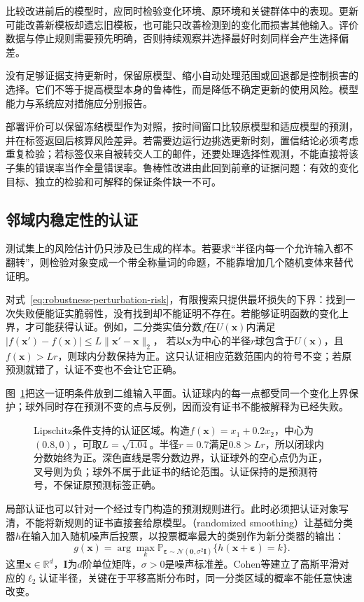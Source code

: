 比较改进前后的模型时，应同时检验变化环境、原环境和关键群体中的表现。更新可能改善新模板却遗忘旧模板，也可能只改善检测到的变化而损害其他输入。评价数据与停止规则需要预先明确，否则持续观察并选择最好时刻同样会产生选择偏差。

没有足够证据支持更新时，保留原模型、缩小自动处理范围或回退都是控制损害的选择。它们不等于提高模型本身的鲁棒性，而是降低不确定更新的使用风险。模型能力与系统应对措施应分别报告。

部署评价可以保留冻结模型作为对照，按时间窗口比较原模型和适应模型的预测，并在标签返回后核算风险差异。若需要边运行边挑选更新时刻，置信结论必须考虑重复检验；若标签仅来自被转交人工的邮件，还要处理选择性观测，不能直接将该子集的错误率当作全量错误率。鲁棒性改进由此回到前章的证据问题：有效的变化目标、独立的检验和可解释的保证条件缺一不可。

\subsection{邻域内稳定性的认证}
\label{sec:robustness-certification}

测试集上的风险估计仍只涉及已生成的样本。若要求“半径内每一个允许输入都不翻转”，则检验对象变成一个带全称量词的命题，不能靠增加几个随机变体来替代证明。

对式~\eqref{eq:robustness-perturbation-risk}，有限搜索只提供最坏损失的下界：找到一次失败便能证实脆弱性，没有找到却不能证明不存在。若能够证明函数的变化上界，才可能获得认证。例如，二分类实值分数$f$在$U(\bm{x})$内满足
$|f(\bm{x}')-f(\bm{x})|\leq L\lVert\bm{x}'-\bm{x}\rVert_2$，
若以$\bm{x}$为中心的半径$r$球包含于$U(\bm{x})$，且$f(\bm{x})>Lr$，则球内分数保持为正。这只认证相应范数范围内的符号不变；若原预测就错了，认证不变也不会让它正确。

图~\ref{fig:trust-certified-region}把这一证明条件放到二维输入平面。认证球内的每一点都受同一个变化上界保护；球外同时存在预测不变的点与反例，因而没有证书不能被解释为已经失败。

\begin{figure}[!htb]
  \centering
  
  \caption{Lipschitz条件支持的认证区域。构造$f(\bm x)=x_1+0.2x_2$，中心为$(0.8,0)$，可取$L=\sqrt{1.04}$。半径$r=0.7$满足$0.8>Lr$，所以闭球内分数始终为正。深色直线是零分数边界，认证球外的空心点仍为正，叉号则为负；球外不属于此证书的结论范围。认证保持的是预测符号，不保证原预测标签正确。}
  \label{fig:trust-certified-region}
\end{figure}

局部认证也可以针对一个经过专门构造的预测规则进行。此时必须把认证对象写清，不能将新规则的证书直接套给原模型。（randomized smoothing）让基础分类器$h$在输入加入随机噪声后投票，以投票概率最大的类别作为新分类器的输出：
\begin{equation}
 g(\bm{x})=\arg\max_k
   \mathbb P_{\bm{\varepsilon}\sim
   \mathcal N(\bm{0},\sigma^2\bm I)}
   \{h(\bm{x}+\bm{\varepsilon})=k\}.
 \label{eq:robustness-smoothing}
\end{equation}
这里$\bm{x}\in\mathbb R^d$，$\bm I$为$d$阶单位矩阵，$\sigma>0$是噪声标准差。Cohen等建立了高斯平滑对应的$\ell_2$认证半径，关键在于平移高斯分布时，同一分类区域的概率不能任意快速改变。

